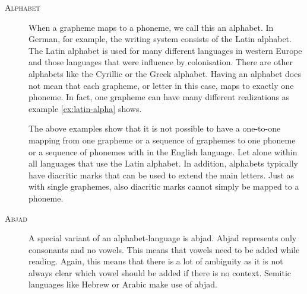 \begin{description}
\item[\textsc{Alphabet}] When a grapheme maps to a phoneme, we call this an alphabet. In German, for example, the writing system consists of the Latin alphabet. The Latin alphabet is used for many different languages in western Europe and those languages that were influence by colonisation. There are other alphabets like the Cyrillic or the Greek alphabet. Having an alphabet does not mean that each grapheme, or letter in this case, maps to exactly one phoneme. In fact, one grapheme can have many different realizations as example \ref{ex:latin-alpha} shows.

The above examples show that it is not possible to have a one-to-one mapping from one grapheme or a sequence of graphemes to one phoneme or a sequence of phonemes with in the English language. Let alone within all languages that use the Latin alphabet. In addition, alphabets typically have diacritic marks that can be used to extend the main letters. Just as with single graphemes, also diacritic marks cannot simply be mapped to a phoneme.

\item[\textsc{Abjad}] A special variant of an alphabet-language is abjad. Abjad represents only consonants and no vowels. This means that vowels need to be added while reading. Again, this means that there is a lot of ambiguity as it is not always clear which vowel should be added if there is no context. Semitic languages like Hebrew or Arabic make use of abjad.



\end{description}

